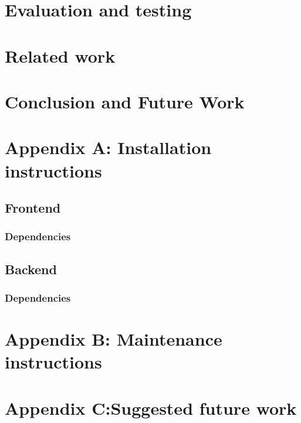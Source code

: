 \documentclass[11pt]{report}
\begin{document}











\chapter{Evaluation and testing}
\chapter{Related work}

\chapter{Conclusion and Future Work}
\chapter{Appendix A: Installation instructions}
\section {Frontend}
\subsection {Dependencies}
\section {Backend}
\subsection {Dependencies}
\chapter {Appendix B: Maintenance instructions}
\chapter {Appendix C:Suggested future work}
\end{document}
